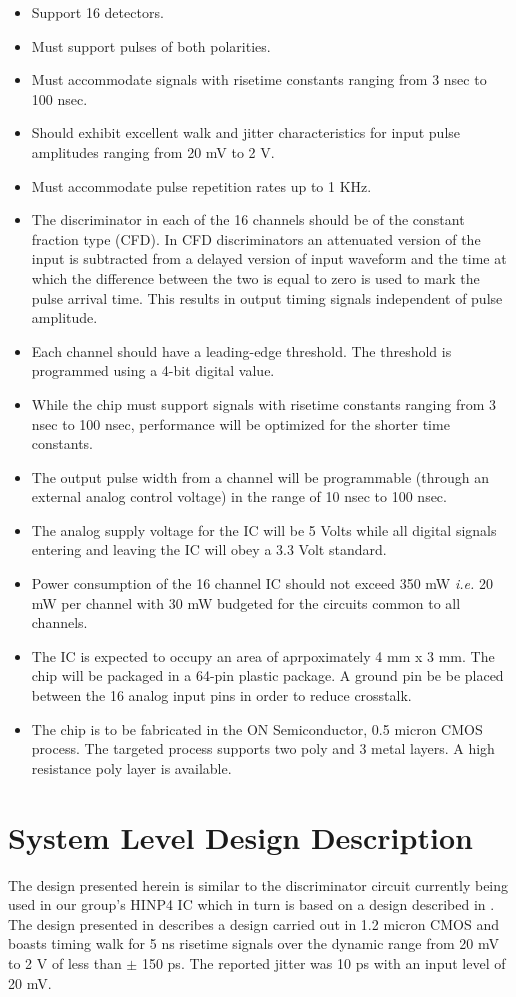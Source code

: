 \documentclass[12pt, onecolumn]{IEEEtran}
\begin{document}
\begin{itemize}
\item
Support 16 detectors.
\item
Must support pulses of both polarities.
\item
Must accommodate signals with risetime constants ranging from 3 nsec to 100 nsec.
\item
Should exhibit excellent walk and jitter characteristics for input pulse amplitudes ranging from 20 mV to 2 V. 
\item
Must accommodate pulse repetition rates up to 1 KHz.
\item
The discriminator in each of the 16 channels should be of the constant fraction type (CFD). In CFD discriminators an attenuated version of the input is subtracted from a delayed version of input waveform and the time at which the difference between the two is equal to zero is used to mark the pulse arrival time. This results in output timing signals independent of pulse amplitude.
\item
Each channel should have a leading-edge threshold. The threshold is programmed using a 4-bit digital value.
\item
While the chip must support signals with risetime constants ranging from 3 nsec to 100 nsec, performance will be optimized for the shorter time constants. 
\item
The output pulse width from a channel will be programmable (through an external analog control voltage) in the range of 10 nsec to 100 nsec.
\item
The analog supply voltage for the IC will be 5 Volts while all digital signals entering and leaving the IC will obey a 3.3 Volt standard.
\item
Power consumption of the 16 channel IC should not exceed 350 mW \emph{i.e.} 20 mW per channel with 30 mW budgeted for the circuits common to all channels. 
\item
The IC is expected to occupy an area of aprpoximately 4 mm x 3 mm.  The chip will be packaged in a 64-pin plastic package.  A ground pin be be placed between the 16 analog input pins in order to reduce crosstalk.
\item
The chip is to be fabricated in the ON Semiconductor, 0.5 micron CMOS process.  The targeted process supports two poly and 3 metal layers.  A high resistance poly layer is available.
\end{itemize} 
 
\section*{System Level Design Description}
\noindent
The design presented herein is similar to the discriminator circuit currently being used in our group's HINP4 IC which in turn is based on a design described in \cite{507173}. The design presented in \cite{507173} describes a design carried out in 1.2 micron CMOS and boasts timing walk for 5 ns risetime signals over the dynamic range from 20 mV to 2 V of less than $\pm$ 150 ps.  The reported jitter was 10 ps with an input level of 20 mV.
\end{document}
